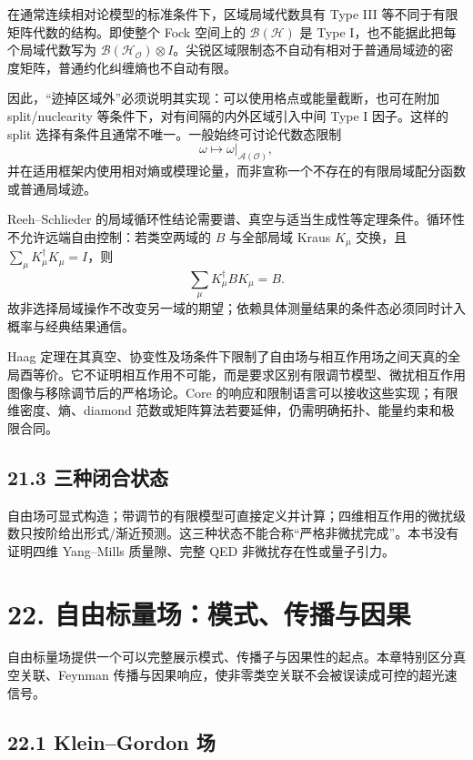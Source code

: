 \documentclass[
  11pt,
  oneside]{book}
\begin{document}
在通常连续相对论模型的标准条件下，区域局域代数具有 Type III
等不同于有限矩阵代数的结构。即使整个 Fock 空间上的
\(\mathcal B(\mathcal H)\) 是 Type I，也不能据此把每个局域代数写为
\(\mathcal B(\mathcal H_{\mathcal O})\otimes I\)。尖锐区域限制态不自动有相对于普通局域迹的密度矩阵，普通约化纠缠熵也不自动有限。

因此，``迹掉区域外''必须说明其实现：可以使用格点或能量截断，也可在附加
split/nuclearity 等条件下，对有间隔的内外区域引入中间 Type I
因子。这样的 split 选择有条件且通常不唯一。一般始终可讨论代数态限制 \[
\omega\longmapsto\omega|_{\mathcal A(\mathcal O)},
\]
并在适用框架内使用相对熵或模理论量，而非宣称一个不存在的有限局域配分函数或普通局域迹。

Reeh--Schlieder
的局域循环性结论需要谱、真空与适当生成性等定理条件。循环性不允许远端自由控制：若类空两域的
\(B\) 与全部局域 Kraus \(K_\mu\) 交换，且
\(\sum_\mu K_\mu^\dagger K_\mu=I\)，则 \[
\sum_\mu K_\mu^\dagger B K_\mu=B.
\]
故非选择局域操作不改变另一域的期望；依赖具体测量结果的条件态必须同时计入概率与经典结果通信。

Haag
定理在其真空、协变性及场条件下限制了自由场与相互作用场之间天真的全局酉等价。它不证明相互作用不可能，而是要求区别有限调节模型、微扰相互作用图像与移除调节后的严格场论。Core
的响应和限制语言可以接收这些实现；有限维密度、熵、diamond
范数或矩阵算法若要延伸，仍需明确拓扑、能量约束和极限合同。

\section{21.3 三种闭合状态}

自由场可显式构造；带调节的有限模型可直接定义并计算；四维相互作用的微扰级数只按阶给出形式/渐近预测。这三种状态不能合称``严格非微扰完成''。本书没有证明四维
Yang--Mills 质量隙、完整 QED 非微扰存在性或量子引力。

\chapter{22. 自由标量场：模式、传播与因果}\label{ch-22}\hypertarget{ch-22}{}

自由标量场提供一个可以完整展示模式、传播子与因果性的起点。本章特别区分真空关联、Feynman
传播与因果响应，使非零类空关联不会被误读成可控的超光速信号。

\section{22.1 Klein--Gordon 场}
\end{document}
